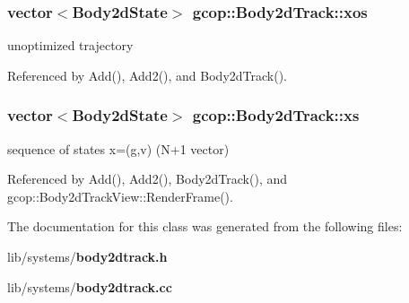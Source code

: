 \subsubsection[{xos}]{\setlength{\rightskip}{0pt plus 5cm}vector$<${\bf \-Body2d\-State}$>$ {\bf gcop\-::\-Body2d\-Track\-::xos}}\label{classgcop_1_1Body2dTrack_ae0b2ae1acc286c6899cc038f472e23f6}


unoptimized trajectory 



\-Referenced by \-Add(), \-Add2(), and \-Body2d\-Track().

\subsubsection[{xs}]{\setlength{\rightskip}{0pt plus 5cm}vector$<${\bf \-Body2d\-State}$>$ {\bf gcop\-::\-Body2d\-Track\-::xs}}\label{classgcop_1_1Body2dTrack_a4362c78c4b8bd415addb38fc9b2fc715}


sequence of states x=(g,v) (\-N+1 vector) 



\-Referenced by \-Add(), \-Add2(), \-Body2d\-Track(), and gcop\-::\-Body2d\-Track\-View\-::\-Render\-Frame().



\-The documentation for this class was generated from the following files\-:\begin{DoxyCompactItemize}
\item 
lib/systems/{\bf body2dtrack.\-h}\item 
lib/systems/{\bf body2dtrack.\-cc}\end{DoxyCompactItemize}
